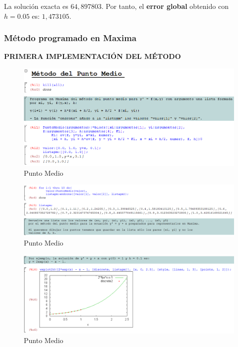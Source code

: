 \documentclass[paper=a4, fontsize=11pt]{scrartcl} %
\numberwithin{equation}{section}
\begin{document}
	La solución exacta es $64,897803$. Por tanto, el \textbf{error global} obtenido con $h = 0.05$ es: $1,473105$.
	
	\newpage
	\subsubsection{Método programado en Maxima}
	\textbf{PRIMERA IMPLEMENTACIÓN DEL MÉTODO}
	\begin{figure}[H]
		\includegraphics[width=1\textwidth]{Pm1.png}
		\caption{Punto Medio}
		\label{fig:Pm1}
	\end{figure}
	\begin{figure}[H]
		\includegraphics[width=1\textwidth]{Pm2.png}
		\caption{Punto Medio}
		\label{fig:Pm2}
	\end{figure}
	\begin{figure}[H]
		\includegraphics[width=1\textwidth]{Pm3.png}
		\caption{Punto Medio}
		\label{fig:Pm3}
	\end{figure}
	
\end{document}
